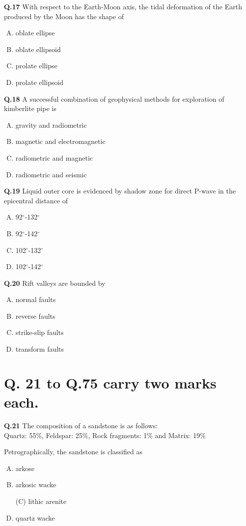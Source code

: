 \textbf{Q.17} With respect to the Earth-Moon axis, the tidal deformation of the Earth produced by the Moon has the shape of
\begin{enumerate}[(A)]
\item oblate ellipse \item  oblate ellipsoid \item prolate ellipse \item  prolate ellipsoid
\end{enumerate}

\textbf{Q.18} A successful combination of geophysical methods for exploration of kimberlite pipe is
\begin{enumerate}[(A)]
\item gravity and radiometric \item  magnetic and electromagnetic
\item radiometric and magnetic \item  radiometric and seismic
\end{enumerate}

\textbf{Q.19} Liquid outer core is evidenced by shadow zone for direct P-wave in the epicentral distance of
\begin{enumerate}[(A)]
\item 92$^{\circ}$-132$^{\circ}$ \item  92$^{\circ}$-142$^{\circ}$
\item 102$^{\circ}$-132$^{\circ}$ \item  102$^{\circ}$-142$^{\circ}$
\end{enumerate}

\textbf{Q.20} Rift valleys are bounded by
\begin{enumerate}[(A)]
\item normal faults \item  reverse faults \item strike-slip faults \item  transform faults
\end{enumerate}


\section*{Q. 21 to Q.75 carry two marks each.}

\textbf{Q.21} The composition of a sandstone is as follows:\\
Quartz: 55\%, Feldspar: 25\%, Rock fragments: 1\% and Matrix: 19\%

Petrographically, the sandstone is classified as
\begin{enumerate}[(A)]
\item arkose \item  arkosic wacke
\item[(C)] lithic arenite \item  quartz wacke
\end{enumerate}

